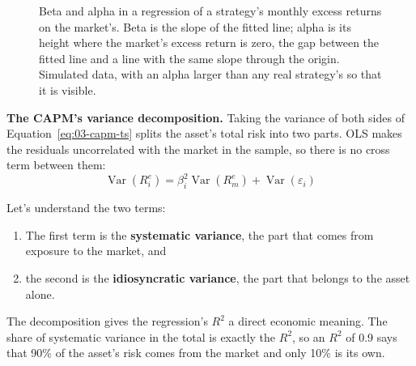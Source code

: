 \begin{figure}[!htbp]
\caption{Beta and alpha in a regression of a strategy's monthly excess returns on the market's. Beta is the slope of the fitted line; alpha is its height where the market's excess return is zero, the gap between the fitted line and a line with the same slope through the origin. Simulated data, with an alpha larger than any real strategy's so that it is visible.}
\label{fig:03-alpha}
\end{figure}

\textbf{The CAPM's variance decomposition.} Taking the variance of both sides of Equation~\eqref{eq:03-capm-ts} splits the asset's total risk into two parts. OLS makes the residuals uncorrelated with the market in the sample, so there is no cross term between them:
\begin{equation}
  \operatorname{Var}(R^{e}_{i}) = \beta_i^2 \operatorname{Var}(R^{e}_{m}) + \operatorname{Var}(\varepsilon_i)
  \label{eq:03-vardec-capm}
\end{equation}

Let's understand the two terms:
\begin{enumerate}
\item The first term is the \textbf{systematic variance}, the part that comes from exposure to the market, and 
\item the second is the \textbf{idiosyncratic variance}, the part that belongs to the asset alone. 
\end{enumerate}
The decomposition gives the regression's $R^2$ a direct economic meaning. The share of systematic variance in the total is exactly the $R^2$, so an $R^2$ of 0.9 says that 90\% of the asset's risk comes from the market and only 10\% is its own.


